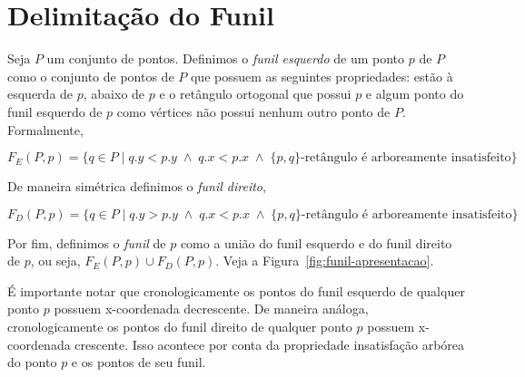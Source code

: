 \section{Delimitação do Funil}

Seja $P$ um conjunto de pontos. Definimos o \textit{funil esquerdo} de um ponto $p$ de $P$ como o conjunto de pontos de $P$ que possuem as seguintes propriedades: estão à esquerda de $p$, abaixo de $p$ e o retângulo ortogonal que possui $p$ e algum ponto do funil esquerdo de $p$ como vértices não possui nenhum outro ponto de $P$. Formalmente, 

$F_E(P,p) = \{q \in P \mid q.y < p.y \; \land \; q.x < p.x \; \land \; \{p,q\}\text{-retângulo é arboreamente insatisfeito}\}$

De maneira simétrica definimos o \textit{funil direito},

$F_D(P,p) = \{q \in P \mid q.y > p.y \; \land \; q.x < p.x \; \land \; \{p,q\}\text{-retângulo é arboreamente insatisfeito}\}$

Por fim, definimos o \textit{funil} de $p$ como a união do funil esquerdo e do funil direito de $p$, ou seja, $F_E(P,p) \cup F_D(P,p)$. Veja a Figura~\ref{fig:funil-apresentacao}.

É importante notar que cronologicamente os pontos do funil esquerdo de qualquer ponto $p$ possuem x-coordenada decrescente. De maneira análoga, cronologicamente os pontos do funil direito de qualquer ponto $p$ possuem x-coordenada crescente. Isso acontece por conta da propriedade insatisfação arbórea do ponto $p$ e os pontos de seu funil.


